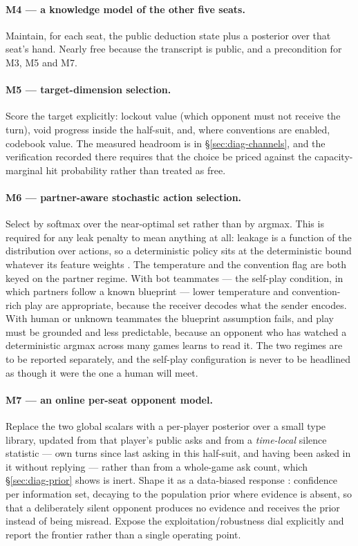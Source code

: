 \paragraph{M4 --- a knowledge model of the other five seats.} Maintain, for each
seat, the public deduction state plus a posterior over that seat's hand. Nearly
free because the transcript is public, and a precondition for M3, M5 and M7.

\paragraph{M5 --- target-dimension selection.} Score the target explicitly:
lockout value (which opponent must not receive the turn), void progress inside
the half-suit, and, where conventions are enabled, codebook value. The measured
headroom is in \S\ref{sec:diag-channels}, and the verification recorded there
requires that the choice be priced against the capacity-marginal hit probability
rather than treated as free.

\paragraph{M6 --- partner-aware stochastic action selection.}
\label{sec:mech-partner}
Select by softmax over the near-optimal set rather than by argmax. This is
required for any leak penalty to mean anything at all: leakage is a function of
the distribution over actions, so a deterministic policy sits at the
deterministic bound whatever its feature weights \cite{alvim-leakage}. The
temperature and the convention flag are both keyed on the partner regime. With
bot teammates --- the self-play condition, in which partners follow a known
blueprint --- lower temperature and convention-rich play are appropriate, because
the receiver decodes what the sender encodes. With human or unknown teammates the
blueprint assumption fails, and play must be grounded and less predictable,
because an opponent who has watched a deterministic argmax across many games
learns to read it. The two regimes are to be reported separately, and the
self-play configuration is never to be headlined as though it were the one a
human will meet.

\paragraph{M7 --- an online per-seat opponent model.} Replace the two global
scalars with a per-player posterior over a small type library, updated from that
player's public asks and from a \emph{time-local} silence statistic --- own turns
since last asking in this half-suit, and having been asked in it without
replying --- rather than from a whole-game ask count, which
\S\ref{sec:diag-prior} shows is inert. Shape it as a data-biased response
\cite{johanson-dbr}: confidence per information set, decaying to the population
prior where evidence is absent, so that a deliberately silent opponent produces
no evidence and receives the prior instead of being misread. Expose the
exploitation/robustness dial explicitly and report the frontier
\cite{johanson-rnash} rather than a single operating point.

